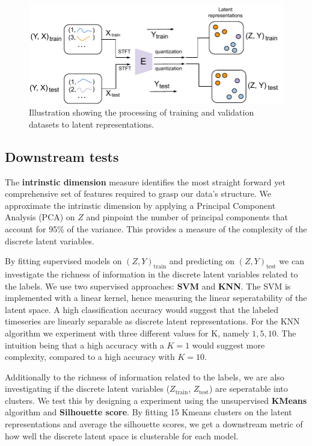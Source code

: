 \begin{figure}[H]
    \includegraphics[scale=0.8]{figures/figure-pdf/Downstreams.pdf}
    \caption{Illustration showing the processing of training and validation datasets to latent representations.}
    \label{fig:latents}
\end{figure}

\subsection{Downstream tests}
The \textbf{intrinstic dimension} measure identifies the most straight forward yet comprehensive set of features required to grasp our data's structure. We approximate the intrinstic dimension by applying a Principal Component Analysis (PCA) on $Z$ and pinpoint the number of principal components that account for 95\%
of the variance. This provides a measure of the complexity of the discrete latent variables. 

By fitting supervised models on $(Z, Y)_\text{train}$ and predicting on $(Z, Y)_\text{test}$ we can investigate the richness of information in the discrete latent variables related to the labels.
We use two supervised approaches: \textbf{SVM} and \textbf{KNN}. The SVM is implemented with a linear kernel, hence measuring the linear seperatability of the latent space. A high classification accuracy would suggest that the labeled timeseries are linearly separable as discrete latent representations. 
For the KNN algorithm we experiment with three different values for K, namely $1, 5, 10$. The intuition being that a high accuracy with a $K=1$ would suggest more complexity, compared to a high accuracy with $K=10$.

Additionally to the richness of information related to the labels, we are also investigating if the discrete latent variables ($Z_\text{train}$, $Z_\text{test}$) are seperatable into clusters. We test this by designing a experiment using the unsupervised \textbf{KMeans} algorithm and \textbf{Silhouette score}.
By fitting 15 Kmeans clusters on the latent representations  and average the silhouette scores, we get a downstream metric of how well the discrete latent space is clusterable for each model. 

